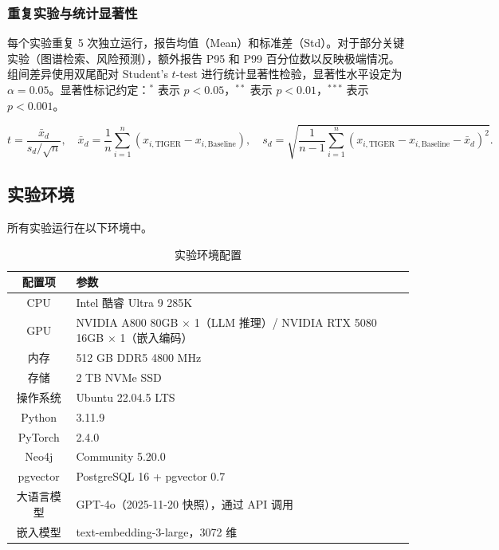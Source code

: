 \subsubsection{重复实验与统计显著性}

每个实验重复 5 次独立运行，报告均值（Mean）和标准差（Std）。对于部分关键实验（图谱检索、风险预测），额外报告 P95 和 P99 百分位数以反映极端情况。组间差异使用双尾配对 Student's $t$-test 进行统计显著性检验，显著性水平设定为 $\alpha=0.05$。显著性标记约定：$^{\ast}$ 表示 $p < 0.05$，$^{\ast\ast}$ 表示 $p < 0.01$，$^{\ast\ast\ast}$ 表示 $p < 0.001$。

\begin{equation}
t = \frac{\bar{x}_d}{s_d / \sqrt{n}}, \quad
\bar{x}_d = \frac{1}{n}\sum_{i=1}^{n}(x_{i,\text{TIGER}} - x_{i,\text{Baseline}}), \quad
s_d = \sqrt{\frac{1}{n-1}\sum_{i=1}^{n}(x_{i,\text{TIGER}} - x_{i,\text{Baseline}} - \bar{x}_d)^2}.
\end{equation}

\subsection{实验环境}
\label{sec:exp-env}

所有实验运行在以下环境中。

\begin{table}[H]
\centering
\caption{实验环境配置}
\label{tab:exp-env}
\begin{tabularx}{0.95\linewidth}{c X}
\toprule
\textbf{配置项} & \textbf{参数} \\
\midrule
CPU & Intel 酷睿 Ultra 9 285K \\
GPU & NVIDIA A800 80GB $\times$ 1（LLM 推理）/ NVIDIA RTX 5080 16GB $\times$ 1（嵌入编码） \\
内存 & 512 GB DDR5 4800 MHz \\
存储 & 2 TB NVMe SSD \\
操作系统 & Ubuntu 22.04.5 LTS \\
Python & 3.11.9 \\
PyTorch & 2.4.0 \\
Neo4j & Community 5.20.0 \\
pgvector & PostgreSQL 16 + pgvector 0.7 \\
大语言模型 & GPT-4o（2025-11-20 快照），通过 API 调用 \\
嵌入模型 & text-embedding-3-large，3072 维 \\
\bottomrule
\end{tabularx}
\end{table}


